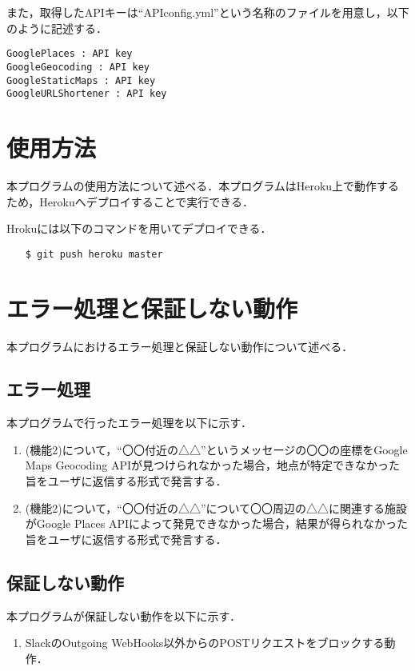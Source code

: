 \documentclass[fleqn, 14pt]{extarticlej}
\begin{document}
また，取得したAPIキーは``APIconfig.yml''という名称のファイルを用意し，以下のように記述する．
\begin{verbatim}
GooglePlaces : API key
GoogleGeocoding : API key
GoogleStaticMaps : API key
GoogleURLShortener : API key
\end{verbatim}

\section{使用方法}
本プログラムの使用方法について述べる．本プログラムはHeroku上で動作するため，Herokuへデプロイすることで実行できる．

Hrokuには以下のコマンドを用いてデプロイできる．

\begin{verbatim}
　　$ git push heroku master
\end{verbatim}

\section{エラー処理と保証しない動作}
本プログラムにおけるエラー処理と保証しない動作について述べる．

\subsection{エラー処理}
本プログラムで行ったエラー処理を以下に示す．

\begin{enumerate}
\item (機能2)について，``〇〇付近の△△''というメッセージの〇〇の座標をGoogle Maps Geocoding APIが見つけられなかった場合，地点が特定できなかった旨をユーザに返信する形式で発言する．
\item (機能2)について，``〇〇付近の△△''について〇〇周辺の△△に関連する施設がGoogle Places APIによって発見できなかった場合，結果が得られなかった旨をユーザに返信する形式で発言する．
\end{enumerate}
\subsection{保証しない動作}
本プログラムが保証しない動作を以下に示す．

\begin{enumerate}
\item SlackのOutgoing WebHooks以外からのPOSTリクエストをブロックする動作．
\end{enumerate}
\end{document}
